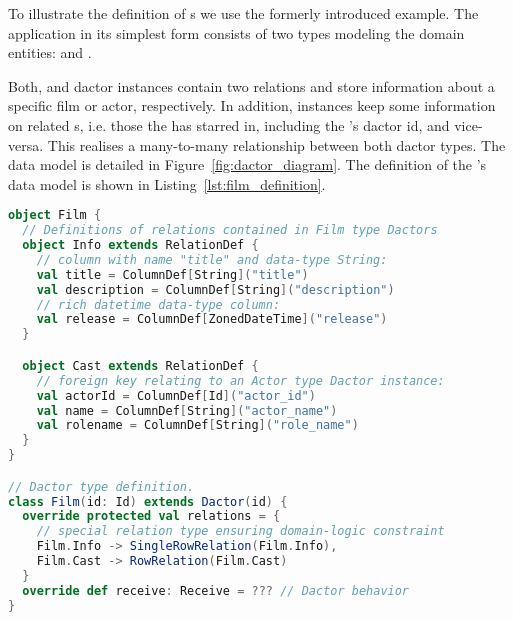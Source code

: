 To illustrate the definition of s we use the formerly introduced example.
The application in its simplest form consists of two  types modeling the domain entities:  and .

Both,  and  \gls{dactor} instances contain two \glspl{relation} and store information about a specific film or actor, respectively.
In addition,  instances keep some information on related s, i.e. those the  has starred in, including the 's \gls{dactor} id, and vice-versa.
This realises a many-to-many relationship between both \gls{dactor} types.
The data model is detailed in Figure~\ref{fig:dactor_diagram}.
The definition of the 's data model is shown in Listing~\ref{lst:film_definition}.

\begin{minipage}{1.0\linewidth}
\begin{lstlisting}[caption=Film Dactor type definition using the actordb framework, label=lst:film_definition, language=Scala]
object Film {
  // Definitions of relations contained in Film type Dactors
  object Info extends RelationDef {
    // column with name "title" and data-type String:
    val title = ColumnDef[String]("title")
    val description = ColumnDef[String]("description")
    // rich datetime data-type column:
    val release = ColumnDef[ZonedDateTime]("release")
  }

  object Cast extends RelationDef {
    // foreign key relating to an Actor type Dactor instance:
    val actorId = ColumnDef[Id]("actor_id")
    val name = ColumnDef[String]("actor_name")
    val rolename = ColumnDef[String]("role_name")
  }
} 

// Dactor type definition.
class Film(id: Id) extends Dactor(id) {
  override protected val relations = {
    // special relation type ensuring domain-logic constraint
    Film.Info -> SingleRowRelation(Film.Info),
    Film.Cast -> RowRelation(Film.Cast)
  }
  override def receive: Receive = ??? // Dactor behavior
}
\end{lstlisting}
\end{minipage}
%

